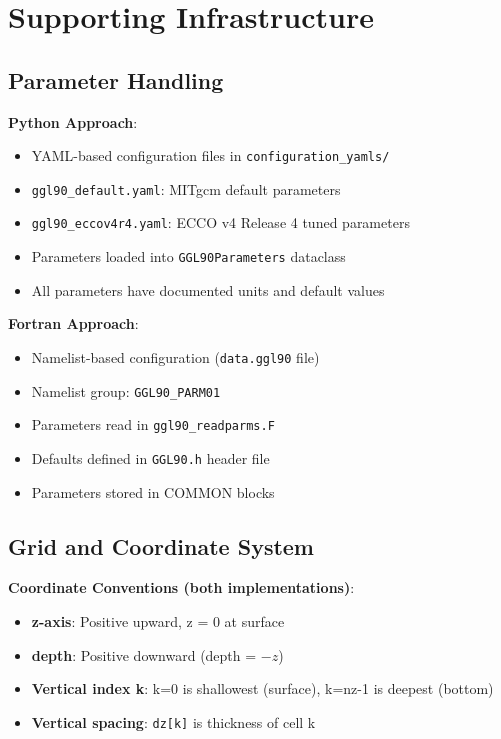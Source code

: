 \documentclass[11pt]{article}
\begin{document}
\section{Supporting Infrastructure}
\label{sec:infrastructure}

\subsection{Parameter Handling}

\textbf{Python Approach}:
\begin{itemize}
    \item YAML-based configuration files in \verb|configuration_yamls/|
    \item \verb|ggl90_default.yaml|: MITgcm default parameters
    \item \verb|ggl90_eccov4r4.yaml|: ECCO v4 Release 4 tuned parameters
    \item Parameters loaded into \verb|GGL90Parameters| dataclass
    \item All parameters have documented units and default values
\end{itemize}

\textbf{Fortran Approach}:
\begin{itemize}
    \item Namelist-based configuration (\verb|data.ggl90| file)
    \item Namelist group: \verb|GGL90_PARM01|
    \item Parameters read in \verb|ggl90_readparms.F|
    \item Defaults defined in \verb|GGL90.h| header file
    \item Parameters stored in COMMON blocks
\end{itemize}

\subsection{Grid and Coordinate System}

\textbf{Coordinate Conventions (both implementations)}:
\begin{itemize}
    \item \textbf{z-axis}: Positive upward, z = 0 at surface
    \item \textbf{depth}: Positive downward (depth = $-z$)
    \item \textbf{Vertical index k}: k=0 is shallowest (surface), k=nz-1 is deepest (bottom)
    \item \textbf{Vertical spacing}: \verb|dz[k]| is thickness of cell k
\end{itemize}
\end{document}
